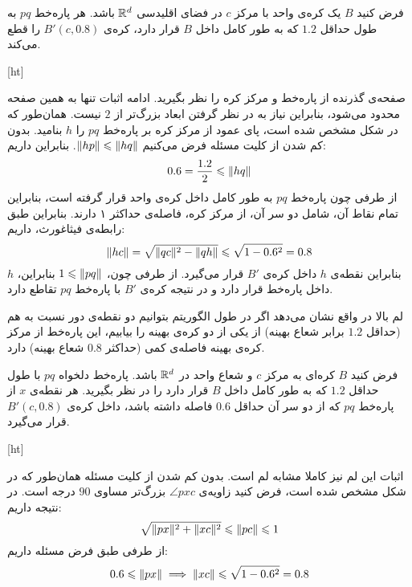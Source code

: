 فرض کنید $B$ یک کره‌ی واحد با مرکز $c$ در فضای اقلیدسی $\mathbb{R}^d$ باشد. هر پاره‌خط $pq$ به طول حداقل $1.2$ که به طور کامل داخل $B$ قرار دارد، کره‌ی $B'(c, 0.8)$ را قطع می‌کند.

[ht]


صفحه‌ی گذرنده از پاره‌خط و مرکز کره را نظر بگیرید. ادامه اثبات تنها به همین صفحه محدود می‌شود، بنابراین نیاز به در نظر گرفتن ابعاد بزرگ‌تر از $2$ نیست. همان‌طور که در شکل  مشخص شده است، پای عمود از مرکز کره بر پاره‌خط $pq$ را $h$ بنامید. بدون کم شدن از کلیت مسئله فرض می‌کنیم $\|{hp}\| \leqslant \|{hq}\|$. بنابراین داریم:
$$0.6 = \frac{1.2}{2} \leqslant \|{hq}\|$$
از‌ طرفی چون پاره‌خط $pq$ به طور کامل داخل کره‌ی واحد قرار گرفته است، بنابراین تمام نقاط آن، شامل دو سر آن، از مرکز کره، فاصله‌ی حداکثر ۱ دارند. بنابراین طبق رابطه‌ی فیثاغورث، داریم:
$$\|{hc}\| = \sqrt{\|{qc}\|^2 - \|{qh}\|} \leqslant \sqrt{1 - 0.6^2} = 0.8$$
بنابراین نقطه‌ی $h$ داخل کره‌ی $B'$ قرار می‌گیرد. از طرفی چون، $1 \leqslant \|{pq}\|$ بنابراین، $h$ داخل پاره‌خط قرار دارد و در نتیجه کره‌ی $B'$ با پاره‌خط $pq$ تقاطع دارد. 


لم بالا در واقع نشان می‌دهد اگر در طول الگوریتم بتوانیم دو نقطه‌ی دور نسبت به هم (حداقل $1.2$ برابر شعاع بهینه) از یکی از دو کره‌ی بهینه را بیابیم، این پاره‌خط از مرکز کره‌ی بهینه فاصله‌ی کمی‌ (حداکثر $0.8$ شعاع بهینه) دارد.

فرض کنید $B$ کره‌ای به مرکز $c$ و شعاع واحد در $\mathbb{R}^d$ باشد. پاره‌خط دلخواه $pq$ با طول حداقل $1.2$ که به طور کامل داخل $B$ قرار دارد را در نظر بگیرید. هر نقطه‌ی $x$ از پاره‌خط $pq$ که از دو سر آن حداقل $0.6$ فاصله داشته باشد، داخل کره‌ی $B'(c, 0.8)$ قرار می‌گیرد.


[ht]


اثبات این لم نیز کاملا مشابه لم  است. بدون کم شدن از کلیت  مسئله همان‌طور که در شکل  مشخص شده است، فرض کنید زاویه‌ی $\angle{pxc}$ بزرگ‌تر مساوی $90$ درجه است. در نتیجه داریم:
$$\sqrt{\|{px}\|^2 + \|{xc}\|^2} \leqslant \|{pc}\| \leqslant 1$$
از طرفی طبق فرض مسئله داریم:
$$0.6 \leqslant \|{px}\| \implies \|{xc}\| \leqslant \sqrt{1 - 0.6^2} = 0.8$$

